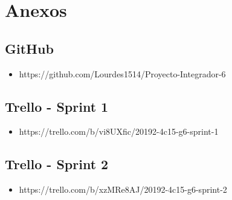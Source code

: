 \chapter{Anexos}
\section{GitHub}
\begin{itemize}
	\item https://github.com/Lourdes1514/Proyecto-Integrador-6
\end{itemize}
\section{Trello - Sprint 1}
\begin{itemize}
	\item https://trello.com/b/vi8UXfic/20192-4c15-g6-sprint-1
\end{itemize}
\section{Trello - Sprint 2}
\begin{itemize}
	\item https://trello.com/b/xzMRe8AJ/20192-4c15-g6-sprint-2
\end{itemize}

